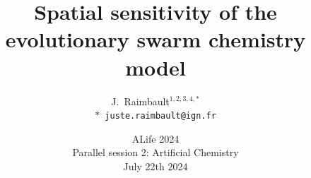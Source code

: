 \documentclass[english,11pt]{beamer}
\begin{document}
\title{Spatial sensitivity of the evolutionary swarm chemistry model}

\author{J.~Raimbault$^{1,2,3,4,\ast}$\\
\texttt{$\ast$ juste.raimbault@ign.fr}
}




\date{ALife 2024\\\smallskip
Parallel session 2: Artificial Chemistry\\\smallskip
July 22th 2024
}

\frame{\maketitle}


\end{document}
